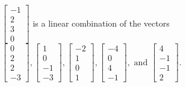 \begin{exercise}
\begin{exerciseStatement}
  \end{exerciseStatement}
  \begin{exerciseAnswer}
   \(\left[\begin{array}{c}
-1 \\
2 \\
3 \\
0
\end{array}\right]\) 
  	 is  
	a linear combination of the vectors \(\left[\begin{array}{c}
0 \\
2 \\
2 \\
-3
\end{array}\right] , \left[\begin{array}{c}
1 \\
0 \\
-1 \\
-3
\end{array}\right] , \left[\begin{array}{c}
-2 \\
1 \\
0 \\
1
\end{array}\right] , \left[\begin{array}{c}
-4 \\
0 \\
4 \\
-1
\end{array}\right] , \text{ and } \left[\begin{array}{c}
4 \\
-1 \\
-1 \\
2
\end{array}\right]\).

	
  


  \end{exerciseAnswer}
\end{exercise}